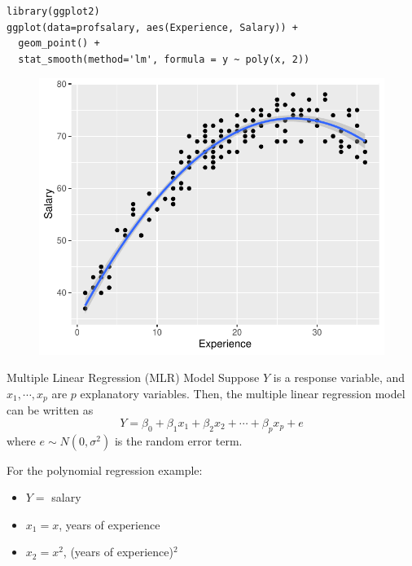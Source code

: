 \documentclass[10pt]{beamer}
\begin{document}
\begin{frame}[fragile]
\begin{verbatim}
library(ggplot2)
ggplot(data=profsalary, aes(Experience, Salary)) +
  geom_point() +
  stat_smooth(method='lm', formula = y ~ poly(x, 2)) 
\end{verbatim}
\begin{figure}
\includegraphics[scale=0.5]{figure/salary_polypred2.pdf}
\end{figure}
\end{frame}

\begin{frame}{Multiple Linear Regression (MLR) Model}
Suppose $Y$ is a response variable, and $x_1, \cdots, x_p$ are $p$ explanatory variables.  Then, the multiple linear regression model can be written as
$$Y = \beta_0 + \beta_1 x_1 + \beta_2 x_2 + \cdots + \beta_p x_p + e$$
where $e \sim N(0,\sigma^2)$ is the random error term.\\
\vspace{20pt}

For the polynomial regression example:\\
\begin{itemize}
\item $Y=$ salary
\item $x_1 = x$, years of experience
\item $x_2 = x^2$, (years of experience)$^2$
\end{itemize}
\end{frame}
\end{document}

